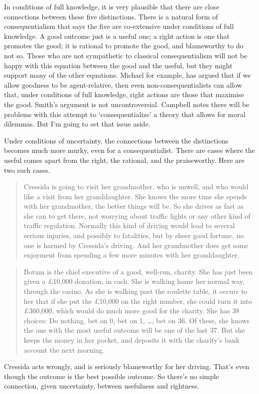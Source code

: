 In conditions of full knowledge, it is very plausible that there are close connections between these five distinctions. There is a natural form of consequentialism that says the five are co-extensive under conditions of full knowledge. A good outcome just is a useful one; a right action is one that promotes the good; it is rational to promote the good, and blameworthy to do not so. Those who are not sympathetic to classical consequentialism will not be happy with this equation between the good and the useful, but they might support many of the other equations. Michael \citet{Smith2006, Smith2009} for example, has argued that if we allow goodness to be agent-relative, then even non-consequentialists can allow that, under conditions of full knowledge, right actions are those that maximise the good. Smith's argument is not uncontroversial. Campbell \citet{Brown2011-BROCT} notes there will be problems with this attempt to `consequentialize' a theory that allows for moral dilemmas. But I'm going to set that issue aside.

Under conditions of uncertainty, the connections between the distinctions becomes much more murky, even for a consequentialist. There are cases where the useful comes apart from the right, the rational, and the praiseworthy. Here are two such cases.

\begin{quote}
\gls{Cressida} is going to visit her grandmother, who is unwell, and who would like a visit from her granddaughter. She knows the more time she spends with her grandmother, the better things will be. So she drives as fast as she can to get there, not worrying about traffic lights or any other kind of traffic regulation. Normally this kind of driving would lead to several serious injuries, and possibly to fatalities, but by sheer good fortune, no one is harmed by \gls{Cressida}'s driving. And her grandmother does get some enjoyment from spending a few more minutes with her granddaughter.
\end{quote}
\begin{quote}
\gls{Botum} is the chief executive of a good, well-run, charity. She has just been given a £10,000 donation, in cash. She is walking home her normal way, through the casino. As she is walking past the roulette table, it occurs to her that if she put the £10,000 on the right number, she could turn it into £360,000, which would do much more good for the charity. She has 38 choices: Do nothing, bet on 0, bet on 1, {\ldots}, bet on 36. Of these, she knows the one with the most useful outcome will be one of the last 37. But she keeps the money in her pocket, and deposits it with the charity's bank account the next morning.
\end{quote}
\gls{Cressida} acts wrongly, and is seriously blameworthy for her driving. That's even though the outcome is the best possible outcome. So there's no simple connection, given uncertainty, between usefulness and rightness.

